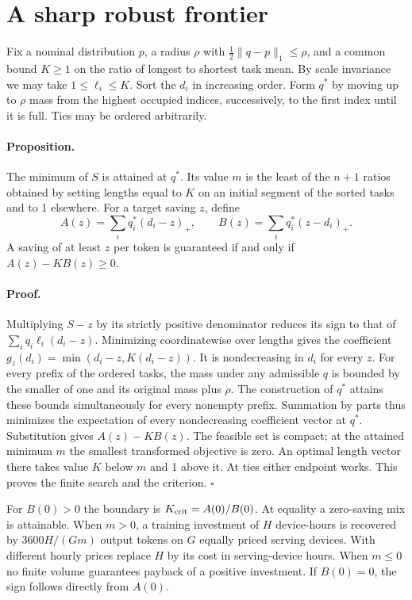 \documentclass[11pt]{article}
\begin{document}
\newpage
\section{A sharp robust frontier}
Fix a nominal distribution $p$, a radius $\rho$ with $\frac12\|q-p\|_1\le\rho$, and a common bound $K\ge1$ on the ratio of longest to shortest task mean. By scale invariance we may take $1\le\ell_i\le K$. Sort the $d_i$ in increasing order. Form $q^*$ by moving up to $\rho$ mass from the highest occupied indices, successively, to the first index until it is full. Ties may be ordered arbitrarily.

\paragraph{Proposition.} The minimum of $S$ is attained at $q^*$. Its value $m$ is the least of the $n+1$ ratios obtained by setting lengths equal to $K$ on an initial segment of the sorted tasks and to 1 elsewhere. For a target saving $z$, define
\[
 A(z)=\sum_i q_i^*(d_i-z)_+,\qquad
 B(z)=\sum_i q_i^*(z-d_i)_+ .
\]
A saving of at least $z$ per token is guaranteed if and only if $A(z)-KB(z)\ge0$.

\paragraph{Proof.} Multiplying $S-z$ by its strictly positive denominator reduces its sign to that of $\sum_i q_i\ell_i(d_i-z)$. Minimizing coordinatewise over lengths gives the coefficient $g_z(d_i)=\min(d_i-z,K(d_i-z))$. It is nondecreasing in $d_i$ for every $z$. For every prefix of the ordered tasks, the mass under any admissible $q$ is bounded by the smaller of one and its original mass plus $\rho$. The construction of $q^*$ attains these bounds simultaneously for every nonempty prefix. Summation by parts thus minimizes the expectation of every nondecreasing coefficient vector at $q^*$. Substitution gives $A(z)-KB(z)$. The feasible set is compact; at the attained minimum $m$ the smallest transformed objective is zero. An optimal length vector there takes value $K$ below $m$ and 1 above it. At ties either endpoint works. This proves the finite search and the criterion. \hfill$\square$

For $B(0)>0$ the boundary is $K_{\rm crit}=A(0)/B(0)$. At equality a zero-saving mix is attainable. When $m>0$, a training investment of $H$ device-hours is recovered by $3600H/(Gm)$ output tokens on $G$ equally priced serving devices. With different hourly prices replace $H$ by its cost in serving-device hours. When $m\le0$ no finite volume guarantees payback of a positive investment. If $B(0)=0$, the sign follows directly from $A(0)$.
\end{document}
